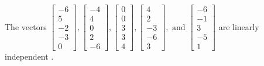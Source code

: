\begin{exercise}
\begin{exerciseStatement}
  \end{exerciseStatement}
  \begin{exerciseAnswer}
   The vectors \(\left[\begin{array}{r}
-6 \\
5 \\
-2 \\
-3 \\
0
\end{array}\right] , \left[\begin{array}{r}
-4 \\
4 \\
0 \\
2 \\
-6
\end{array}\right] , \left[\begin{array}{r}
0 \\
0 \\
3 \\
3 \\
4
\end{array}\right] , \left[\begin{array}{r}
4 \\
2 \\
-3 \\
-6 \\
3
\end{array}\right] , \text{ and } \left[\begin{array}{r}
-6 \\
-1 \\
3 \\
-5 \\
1
\end{array}\right]\) are 
  	 linearly independent  .
  


  \end{exerciseAnswer}
\end{exercise}